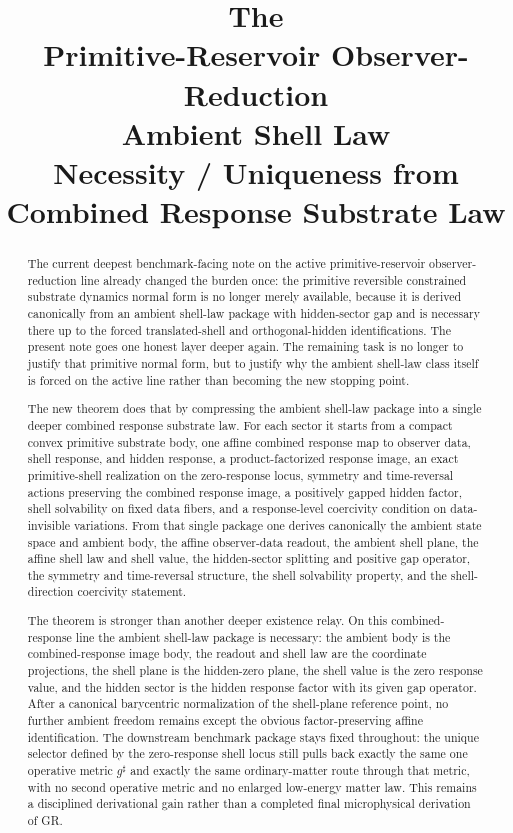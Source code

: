 \documentclass[11pt]{article}
\title{\textbf{The \TheoryName{}}\\[0.4em]
\large Primitive-Reservoir Observer-Reduction\\
\large Ambient Shell Law\\
\large Necessity / Uniqueness from Combined Response Substrate Law}
\author{}
\date{}
\newcommand{\CompletedMetric}{g^{\sharp}}
\begin{document}
\maketitle

\begin{abstract}
The current deepest benchmark-facing note on the active primitive-reservoir observer-reduction line already changed the burden once: the primitive reversible constrained substrate dynamics normal form is no longer merely available, because it is derived canonically from an ambient shell-law package with hidden-sector gap and is necessary there up to the forced translated-shell and orthogonal-hidden identifications. The present note goes one honest layer deeper again. The remaining task is no longer to justify that primitive normal form, but to justify why the ambient shell-law class itself is forced on the active line rather than becoming the new stopping point.

The new theorem does that by compressing the ambient shell-law package into a single deeper combined response substrate law. For each sector it starts from a compact convex primitive substrate body, one affine combined response map to observer data, shell response, and hidden response, a product-factorized response image, an exact primitive-shell realization on the zero-response locus, symmetry and time-reversal actions preserving the combined response image, a positively gapped hidden factor, shell solvability on fixed data fibers, and a response-level coercivity condition on data-invisible variations. From that single package one derives canonically the ambient state space and ambient body, the affine observer-data readout, the ambient shell plane, the affine shell law and shell value, the hidden-sector splitting and positive gap operator, the symmetry and time-reversal structure, the shell solvability property, and the shell-direction coercivity statement.

The theorem is stronger than another deeper existence relay. On this combined-response line the ambient shell-law package is necessary: the ambient body is the combined-response image body, the readout and shell law are the coordinate projections, the shell plane is the hidden-zero plane, the shell value is the zero response value, and the hidden sector is the hidden response factor with its given gap operator. After a canonical barycentric normalization of the shell-plane reference point, no further ambient freedom remains except the obvious factor-preserving affine identification. The downstream benchmark package stays fixed throughout: the unique selector defined by the zero-response shell locus still pulls back exactly the same one operative metric \(\CompletedMetric\) and exactly the same ordinary-matter route through that metric, with no second operative metric and no enlarged low-energy matter law. This remains a disciplined derivational gain rather than a completed final microphysical derivation of GR.
\end{abstract}
\end{document}

